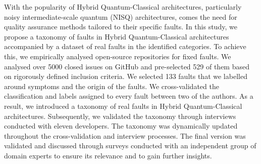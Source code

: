 With the popularity of Hybrid Quantum-Classical architectures, particularly noisy intermediate-scale quantum (NISQ) architectures,  comes the need for quality assurance methods tailored to their specific faults. In this study, we propose a taxonomy of faults in Hybrid Quantum-Classical architectures accompanied by a dataset of real faults in the identified categories. To achieve this, we empirically analysed open-source repositories for fixed faults. We analysed over 5000 closed issues on GitHub and pre-selected 529 of them based on rigorously defined inclusion criteria. We selected 133 faults that we labelled around symptoms and the origin of the faults. We cross-validated the classification and labels assigned to every fault between two of the authors. As a result, we introduced a taxonomy of real faults in Hybrid Quantum-Classical architectures. Subsequently, we validated the taxonomy through interviews conducted with eleven developers.  The taxonomy was dynamically updated throughout the cross-validation and interview processes.  The final version was validated and discussed through surveys conducted with an independent group of domain experts to ensure its relevance and to gain further insights.